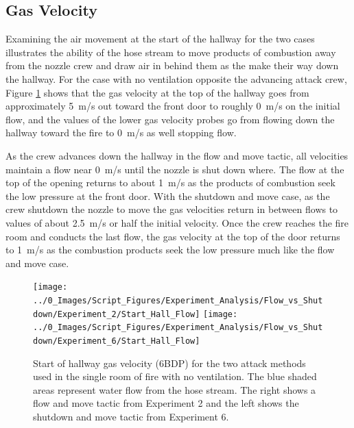 \documentclass[12pt,oneside]{book}
\begin{document}

\subsection{Gas Velocity}
Examining the air movement at the start of the hallway for the two cases illustrates the ability of the hose stream to move products of combustion away from the nozzle crew and draw air in behind them as the make their way down the hallway. For the case with no ventilation opposite the advancing attack crew, Figure \ref{fig:Flow_vs_Shut_Single_No_Vent_Velocity} shows that the gas velocity at the top of the hallway goes from approximately 5~m/s out toward the front door to roughly 0~m/s on the initial flow, and the values of the lower gas velocity probes go from flowing down the hallway toward the fire to 0~m/s as well stopping flow. 

As the crew advances down the hallway in the flow and move tactic, all velocities maintain a flow near 0~m/s until the nozzle is shut down where. The flow at the top of the opening returns to about 1~m/s as the products of combustion seek the low pressure at the front door.  With the shutdown and move case, as the crew shutdown the nozzle to move the gas velocities return in between flows to values of about 2.5~m/s or half the initial velocity. Once the crew reaches the fire room and conducts the last flow, the gas velocity at the top of the door returns to 1~m/s as the combustion products seek the low pressure much like the flow and move case.

\begin{figure}[H]
\centering
\texttt{[image: ../0\_Images/Script\_Figures/Experiment\_Analysis/Flow\_vs\_Shutdown/Experiment\_2/Start\_Hall\_Flow]}
\texttt{[image: ../0\_Images/Script\_Figures/Experiment\_Analysis/Flow\_vs\_Shutdown/Experiment\_6/Start\_Hall\_Flow]}
\caption[Single Room - No Vent - Flow \& Move vs. Shutdown \& Move - Airflow]{Start of hallway gas velocity (6BDP) for the two attack methods used in the single room of fire with no ventilation. The blue shaded areas represent water flow from the hose stream. The right shows a flow and move tactic from Experiment 2 and the left shows the shutdown and move tactic from Experiment 6.}
\label{fig:Flow_vs_Shut_Single_No_Vent_Velocity}
\end{figure}
\end{document}

